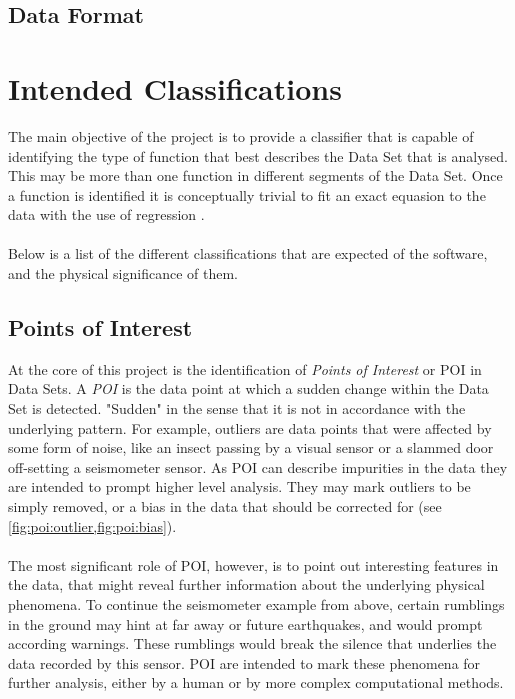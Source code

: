 \documentclass[main.tex]{subfiles}
\begin{document}
    
    \subsection{Data Format}
    
  \section{Intended Classifications}
    
    The main objective of the project is to provide a classifier that is capable of identifying the type of function that best describes the Data Set that is analysed. This may be more than one function in different segments of the Data Set. Once a function is identified it is conceptually trivial to fit an exact equasion to the data with the use of regression \cite{}. 
    \\\\
    Below is a list of the different classifications that are expected of the software, and the physical significance of them.
    
    \subsection{Points of Interest}  
      \label{sec:POI}
      
      At the core of this project is the identification of \textit{Points of Interest} or POI in Data Sets. A \textit{POI} is the data point at which a sudden change within the Data Set is detected. "Sudden" in the sense that it is not in accordance with the underlying pattern. For example, outliers are data points that were affected by some form of noise, like an insect passing by a visual sensor or a slammed door off-setting a seismometer sensor. As POI can describe impurities in the data they are intended to prompt higher level analysis. They may mark outliers to be simply removed, or a bias in the data that should be corrected for (see \cref{fig:poi:outlier,fig:poi:bias}). 
      \\\\
      The most significant role of POI, however, is to point out interesting features in the data, that might reveal further information about the underlying physical phenomena. To continue the seismometer example from above, certain rumblings in the ground may hint at far away or future earthquakes, and would prompt according warnings. These rumblings would break the silence that underlies the data recorded by this sensor. POI are intended to mark these phenomena for further analysis, either by a human or by more complex computational methods.
      
\end{document}
